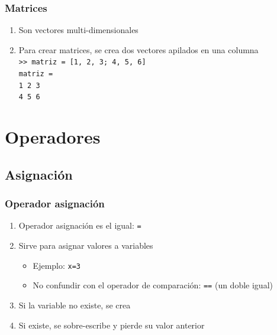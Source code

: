 \begin{frame}[label=matrices]
 \frametitle{Matrices}
 \begin{enumerate}
  \item Son vectores multi-dimensionales
  \item Para crear matrices, se crea dos vectores apilados en una columna
    \\\texttt{>> matriz = [1, 2, 3; 4, 5, 6] \\matriz = \\ \hspace*{0.5cm} 1
    \hspace*{0.25cm} 2 \hspace*{0.25cm} 3 \\ \hspace*{0.5cm} 4 \hspace*{0.25cm}
    5 \hspace*{0.25cm} 6}
 \end{enumerate}
\end{frame}
\section{Operadores}
\subsection{Asignación}
\begin{frame}[label=oper_asignacion]
 \frametitle{Operador asignación}
 \begin{enumerate}
 \item Operador asignación es el igual: \alert{\texttt{=}}
 \item Sirve para asignar valores a variables
  \begin{itemize}
   \item Ejemplo: \texttt{x=3}
   \item \alert{No confundir} con el operador de comparación:
        \alert{\texttt{==}} (un doble igual)
  \end{itemize}
 \item Si la variable no existe, se \alert{crea}
 \item Si existe, se \alert{sobre-escribe} y \alert{pierde} su valor anterior
 \end{enumerate}
\end{frame}
